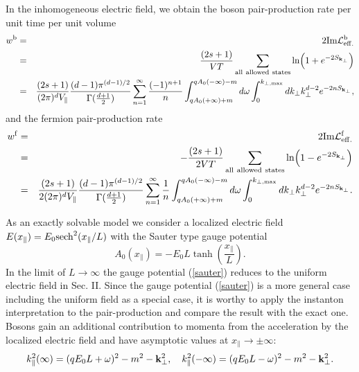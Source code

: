 \documentclass[a4paper,prd,showpacs,preprintnumbers,amsmath,amssymb]{revtex4}
\begin{document}
In the inhomogeneous electric field, we obtain the boson
pair-production rate per unit time per unit volume
\begin{eqnarray}
w^{\rm b} &=& 2 {\rm Im} {\cal L}^{\rm b}_{\rm eff.}\nonumber\\
&=& \frac{(2s +1)}{VT} \sum_{\rm all ~allowed ~states} \ln \Bigl(1
+ e^{- 2 S_{{\bf k}_{\perp}}} \Bigr) \nonumber\\ &=& \frac{(2s
+1)}{(2 \pi)^d V_{\parallel}} \frac{(d-1)
\pi^{(d-1)/2}}{\Gamma(\frac{d+1}{2})} \sum_{n = 1}^{\infty}
\frac{(-1)^{n+1}}{n} \int^{ qA_0(- \infty) - m}_{qA_0 (+ \infty) +
m} d\omega \int_{0}^{k_{\perp, {\rm max}}} dk_{\perp}
k_{\perp}^{d-2} e^{- 2 n S_{{\bf k}_{\perp}}}, \label{inh bos
rate}
\end{eqnarray}
and the fermion pair-production rate
\begin{eqnarray}
w^{\rm f} &=& 2 {\rm Im} {\cal L}^{\rm f}_{\rm eff.} \nonumber\\
&=& - \frac{(2s +1)}{2 VT} \sum_{\rm all~ allowed ~states} \ln
\Bigl(1 - e^{- 2 S_{{\bf k}_{\perp}}} \Bigr) \nonumber\\ &=&
\frac{(2s +1)}{2 (2 \pi)^d V_{\parallel}} \frac{(d-1)
\pi^{(d-1)/2}}{\Gamma(\frac{d+1}{2})} \sum_{n = 1}^{\infty}
\frac{1}{n} \int^{qA_0(- \infty) - m}_{qA_0 (+ \infty) + m}
d\omega \int_{0}^{k_{\perp, {\rm max}}} dk_{\perp} k_{\perp}^{d-2}
e^{- 2 n S_{{\bf k}_{\perp}}}. \label{inh fer rate}
\end{eqnarray}





As an exactly solvable model we consider a localized electric
field $E(x_{\parallel}) = E_0 {\rm sech}^2(x_{\parallel}/L)$ with
the Sauter type gauge potential \cite{sau,nik}
\begin{equation}
A_0 (x_{\parallel}) = - E_0 L \tanh (\frac{x_{\parallel}}{L}).
\label{sauter}
\end{equation}
In the limit of $L \rightarrow \infty$ the gauge potential
(\ref{sauter}) reduces to the uniform electric field in Sec. II.
Since the gauge potential (\ref{sauter}) is a more general case
including the uniform field as a special case, it is worthy to
apply the instanton interpretation to the pair-production and
compare the result with the exact one. Bosons gain an additional
contribution to momenta from the acceleration by the localized
electric field and have asymptotic values at $x_{\parallel}
\rightarrow \pm \infty$:
\begin{equation}
k_{\parallel}^2 (\infty) = (qE_0 L +\omega)^2 - m^2 - {\bf
k}^2_{\perp}, \quad k_{\parallel}^2 (- \infty) = (qE_0 L -
\omega)^2 - m^2 - {\bf k}^2_{\perp}.
\end{equation}
\end{document}
